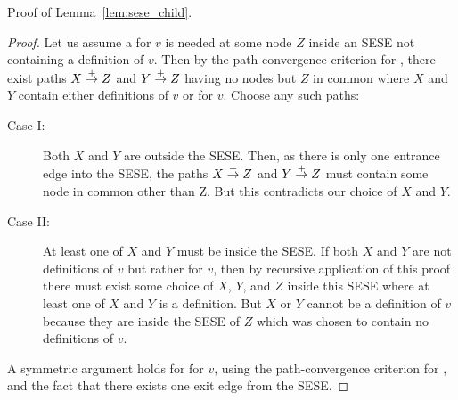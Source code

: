 \noindent
Proof of Lemma~\ref{lem:sese_child}.
\begin{proof}
Let us assume a \phifunction for $v$ is needed at some node $Z$
inside an SESE not containing a definition of $v$.  
Then by the path-convergence criterion for ,
there exist paths $X \stackrel{+}{\rightarrow} Z$ and $Y \stackrel{+}{\rightarrow} Z$
having no nodes but $Z$ in common where $X$ and $Y$ contain either
definitions of $v$ or  for $v$.  Choose any such
paths:
\begin{description}
\item[Case I:] Both $X$ and $Y$ are outside the SESE.  Then, as there
is only one entrance edge into the SESE, the paths $X \stackrel{+}{\rightarrow} Z$ and
$Y \stackrel{+}{\rightarrow} Z$ must contain some node in common other than Z.  But
this contradicts our choice of $X$ and $Y$.
\item[Case II:] At least one of $X$ and $Y$ must be inside the SESE.
If both $X$ and $Y$ are not definitions of $v$ but rather
 for $v$, then by recursive application of this proof
there must exist some choice of $X$, $Y$, and $Z$ inside this SESE
where at least one of $X$ and $Y$ is a definition.  But $X$ or $Y$
cannot be a definition of $v$ because they are inside the SESE of $Z$ which
was chosen to contain no definitions of $v$.
\end{description}

A symmetric argument holds for  for $v$, using
the path-convergence criterion for , and the fact
that there exists one exit edge from the SESE.
\end{proof}


